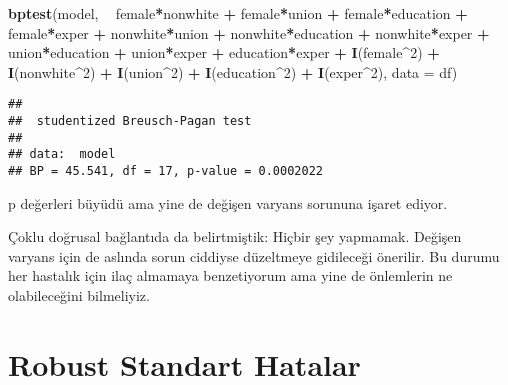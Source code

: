 \documentclass[
]{book}
\newenvironment{Shaded}{\begin{snugshade}}{\end{snugshade}}
\newcommand{\DataTypeTok}[1]{\textcolor[rgb]{0.13,0.29,0.53}{#1}}
\newcommand{\DecValTok}[1]{\textcolor[rgb]{0.00,0.00,0.81}{#1}}
\newcommand{\KeywordTok}[1]{\textcolor[rgb]{0.13,0.29,0.53}{\textbf{#1}}}
\newcommand{\NormalTok}[1]{#1}
\newcommand{\OperatorTok}[1]{\textcolor[rgb]{0.81,0.36,0.00}{\textbf{#1}}}
\newcommand{\StringTok}[1]{\textcolor[rgb]{0.31,0.60,0.02}{#1}}
\begin{document}
\begin{Shaded}
\begin{Highlighting}[]
\KeywordTok{bptest}\NormalTok{(model, }\OperatorTok{~}\StringTok{ }\NormalTok{female}\OperatorTok{*}\NormalTok{nonwhite }\OperatorTok{+}\StringTok{ }\NormalTok{female}\OperatorTok{*}\NormalTok{union }\OperatorTok{+}\StringTok{ }\NormalTok{female}\OperatorTok{*}\NormalTok{education }\OperatorTok{+}\StringTok{ }\NormalTok{female}\OperatorTok{*}\NormalTok{exper }\OperatorTok{+}\StringTok{ }\NormalTok{nonwhite}\OperatorTok{*}\NormalTok{union }\OperatorTok{+}\StringTok{ }\NormalTok{nonwhite}\OperatorTok{*}\NormalTok{education }\OperatorTok{+}\StringTok{ }\NormalTok{nonwhite}\OperatorTok{*}\NormalTok{exper }\OperatorTok{+}\StringTok{ }\NormalTok{union}\OperatorTok{*}\NormalTok{education }\OperatorTok{+}\StringTok{ }\NormalTok{union}\OperatorTok{*}\NormalTok{exper }\OperatorTok{+}\StringTok{ }\NormalTok{education}\OperatorTok{*}\NormalTok{exper }\OperatorTok{+}\StringTok{ }\KeywordTok{I}\NormalTok{(female}\OperatorTok{^}\DecValTok{2}\NormalTok{) }\OperatorTok{+}\StringTok{ }\KeywordTok{I}\NormalTok{(nonwhite}\OperatorTok{^}\DecValTok{2}\NormalTok{) }\OperatorTok{+}\StringTok{ }\KeywordTok{I}\NormalTok{(union}\OperatorTok{^}\DecValTok{2}\NormalTok{) }\OperatorTok{+}\StringTok{ }\KeywordTok{I}\NormalTok{(education}\OperatorTok{^}\DecValTok{2}\NormalTok{) }\OperatorTok{+}\StringTok{ }\KeywordTok{I}\NormalTok{(exper}\OperatorTok{^}\DecValTok{2}\NormalTok{), }\DataTypeTok{data =}\NormalTok{ df)}
\end{Highlighting}
\end{Shaded}

\begin{verbatim}
## 
##  studentized Breusch-Pagan test
## 
## data:  model
## BP = 45.541, df = 17, p-value = 0.0002022
\end{verbatim}

p değerleri büyüdü ama yine de değişen varyans sorununa işaret ediyor.

Çoklu doğrusal bağlantıda da belirtmiştik: Hiçbir şey yapmamak. Değişen varyans için de aslında sorun ciddiyse düzeltmeye gidileceği önerilir. Bu durumu her hastalık için ilaç almamaya benzetiyorum ama yine de önlemlerin ne olabileceğini bilmeliyiz.

\hypertarget{robust-standart-hatalar}{%
\section{Robust Standart Hatalar}\label{robust-standart-hatalar}}
\end{document}
